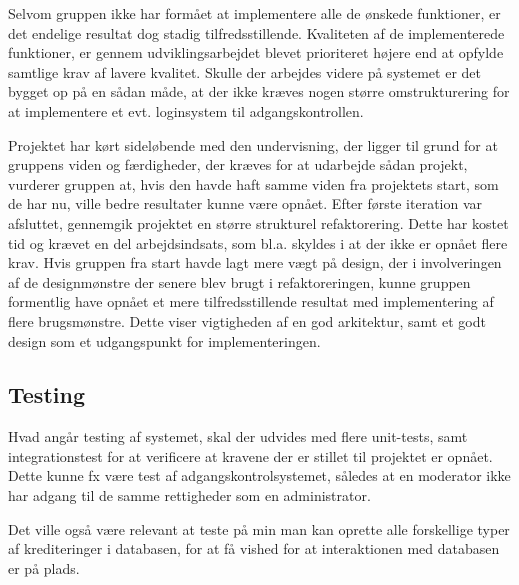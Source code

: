 Selvom gruppen ikke har formået at implementere alle de ønskede funktioner, er
det endelige resultat dog stadig tilfredsstillende. Kvaliteten af de
implementerede funktioner, er gennem udviklingsarbejdet blevet prioriteret
højere end at opfylde samtlige krav af lavere kvalitet. Skulle der arbejdes
videre på systemet er det bygget op på en sådan måde, at der ikke kræves nogen
større omstrukturering for at implementere et evt. loginsystem til
adgangskontrollen.

Projektet har kørt sideløbende med den undervisning, der ligger til
grund for at gruppens viden og færdigheder, der kræves for at udarbejde
sådan projekt, vurderer gruppen at, hvis den havde haft samme viden fra projektets
start, som de har nu, ville bedre resultater kunne være opnået. Efter første
iteration var afsluttet, gennemgik projektet en større strukturel
refaktorering. Dette har kostet tid og krævet en del arbejdsindsats, som bl.a.
skyldes i at der ikke er opnået flere krav. Hvis gruppen fra start havde lagt
mere vægt på design, der i involveringen af de designmønstre der senere blev
brugt i refaktoreringen, kunne gruppen formentlig have opnået et mere
tilfredsstillende resultat med implementering af flere brugsmønstre.
Dette viser vigtigheden af en god arkitektur, samt et godt design som et
udgangspunkt for implementeringen. 


\subsection{Testing}%
\label{ssub:testing}

Hvad angår testing af systemet, skal der udvides med flere unit-tests, samt
integrationstest for at verificere at kravene der er stillet til projektet er
opnået. Dette kunne fx være test af adgangskontrolsystemet, således at en
moderator ikke har adgang til de samme rettigheder som en administrator.

Det ville også være relevant at teste på min man kan oprette alle forskellige
typer af krediteringer i databasen, for at få vished for at interaktionen med
databasen er på plads.

